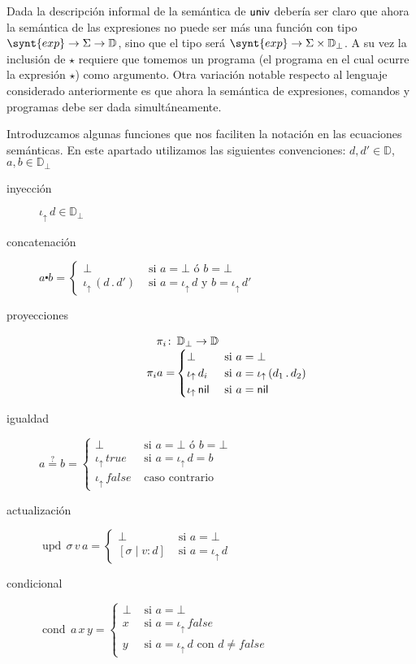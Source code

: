 \documentclass[a4paper,twoside,12pt]{article}
\newcommand{\trees}{\mathbb{D}}
\newcommand{\nil}{\mathsf{nil}}
\newcommand{\cons}[2]{(#1\, .\, #2)}
\newcommand{\falseD}{\mathit{false}}
\newcommand{\trueD}{\mathit{true}}
\begin{document}
Dada la descripción informal de la semántica de $\mathsf{univ}$ debería ser
claro que ahora la semántica de las expresiones no puede ser más una
función con tipo $\synt{exp} \to \Sigma \to \trees$, sino que el tipo
será $\synt{exp} \to \Sigma \times \trees_{\bot}$. A su vez la
inclusión de $\star$ requiere que tomemos un programa (el programa en
el cual ocurre la expresión $\star$) como argumento.
Otra variación notable respecto al lenguaje considerado anteriormente
es que ahora la semántica de expresiones, comandos y programas debe ser
dada simultáneamente. 

\newcommand{\inj}[1]{\iota_\uparrow\,#1} Introduzcamos algunas
funciones que nos faciliten la notación en las ecuaciones semánticas.
En este apartado utilizamos las siguientes convenciones: $d,d'\in\trees$,
$a,b\in\trees_\bot$
\begin{description}
\item[inyección] $\inj d \in\trees_{\bot}$
\item[concatenación] 
  $a \centerdot b =
  \begin{cases}
    \bot & \text{ si } a = \bot \text{ ó } b = \bot\\
    \inj{\cons{d}{d'}} & \text{ si } a = \inj{d} \text{ y } b = \inj{d'}
  \end{cases}
  $
\item[proyecciones] 
  \[
  \begin{array}{r@{\,}l}
  \pi_i \colon& \trees_\bot \to \trees \\
  \pi_i a =&
  \begin{cases}
   \bot & \text{ si } a = \bot\\
   \inj{d_i} & \text{ si } a = \inj{\cons{d_1}{d_2}}\\
   \inj{\nil} & \text{ si } a = \nil 
  \end{cases}
  \end{array}
  \]
\item[igualdad] 
  $a \overset{?}{=} b =
  \begin{cases}
    \bot & \text{ si } a = \bot \text{ ó } b = \bot\\
    \inj{\trueD} & \text{ si } a = \inj{d} = b\\
    \inj{\falseD} & \text{ caso contrario}
  \end{cases}
  $
\item[actualización]
$\mathop{upd}\,\sigma\,v\,a =
\begin{cases}
  \bot & \text{ si } a = \bot \\
  [\sigma \mid v : d ] & \text{ si } a = \inj{d}
\end{cases}
$
\item[condicional]
  $\mathop{cond}\,a\,x\,y =
  \begin{cases}
    \bot & \text{ si } a = \bot\\
    x & \text{ si } a = \inj{\falseD}\\
    y & \text{ si } a = \inj{d} \text{ con } d\neq \falseD
  \end{cases}
  $
\end{description}
\end{document}
